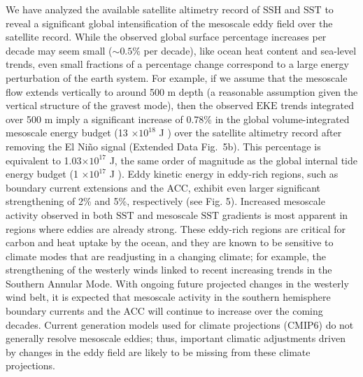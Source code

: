 \documentclass{nature}
\newcommand{\EKE}{\text{EKE}}
\newcommand{\SST}{\text{SST}}
\newcommand{\SSH}{\text{SSH}}
\begin{document}
We have analyzed the available satellite altimetry record of $\SSH$ and $\SST$ to reveal a significant global intensification of the mesoscale eddy field over the satellite record. While the observed global surface percentage increases per decade may seem small ($\sim0.5\%$ per decade), like ocean heat content and sea-level trends, even small fractions of a percentage change correspond to a large energy perturbation of the earth system. For example, if we assume that the mesoscale flow extends vertically to around 500 m depth (a reasonable assumption given the vertical structure of the gravest mode\cite{Lama_Vmodes_2016}), then the observed $\EKE$ trends integrated over 500 m imply a significant increase of 0.78\% in the global volume-integrated mesoscale energy budget (13 $\times10^{18}$ J \cite{Wunsch_energy_2004}) over the satellite altimetry record after removing the El Ni\~no signal (Extended Data Fig.~5b). This percentage is equivalent to 1.03$\times10^{17}$ J, the same order of magnitude as the global internal tide energy budget (1 $\times10^{17}$ J \cite{Wunsch_energy_2004}). Eddy kinetic energy in eddy-rich regions, such as boundary current extensions and the ACC, exhibit even larger significant strengthening of 2\% and 5\%, respectively (see Fig. 5). Increased mesoscale activity observed in both $\SST$ and mesoscale $\SST$ gradients is most apparent in regions where eddies are already strong. These eddy-rich regions are critical for carbon and heat uptake by the ocean\cite{Foppert_Eddy_2017,Gnanadesikan_carbon_uptake_2015}, and they are known to be sensitive to climate modes that are readjusting in a changing climate; for example, the strengthening of the westerly winds\cite{Hogg_Recent_2015} linked to recent increasing trends in the Southern Annular Mode\cite{Nerilie_SAM_2014,Gillett_SAM_2013}. With ongoing future projected changes in the westerly wind belt, it is expected that mesoscale activity in the southern hemisphere boundary currents and the ACC will continue to increase over the coming decades. Current generation models used for climate projections (CMIP6) do not generally resolve mesoscale eddies\cite{Haarsma_CMIP6_2016}; thus, important climatic adjustments driven by changes in the eddy field are likely to be missing from these climate projections.
\end{document}
